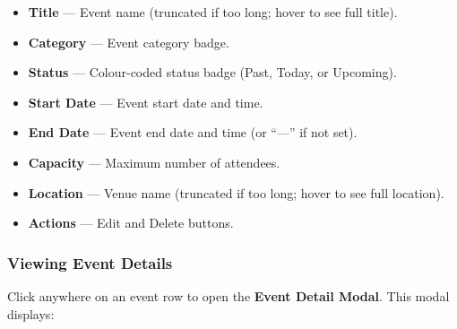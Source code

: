 \documentclass[12pt, a4paper]{article}
\begin{document}
\begin{itemize}[leftmargin=1.5em]
  \item \textbf{Title} — Event name (truncated if too long; hover to see full title).
  \item \textbf{Category} — Event category badge.
  \item \textbf{Status} — Colour-coded status badge (Past, Today, or Upcoming).
  \item \textbf{Start Date} — Event start date and time.
  \item \textbf{End Date} — Event end date and time (or ``—'' if not set).
  \item \textbf{Capacity} — Maximum number of attendees.
  \item \textbf{Location} — Venue name (truncated if too long; hover to see full location).
  \item \textbf{Actions} — Edit and Delete buttons.
\end{itemize}

\subsubsection{Viewing Event Details}

Click anywhere on an event row to open the \textbf{Event Detail Modal}. This modal displays:
\end{document}

